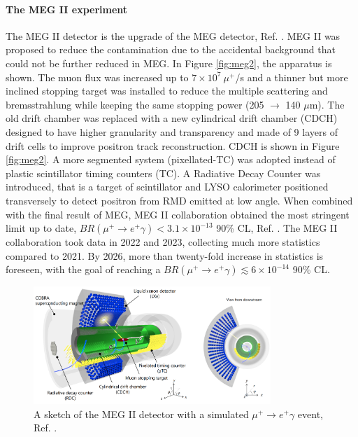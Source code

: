 \paragraph{The MEG II experiment}
The MEG II detector is the upgrade of the MEG detector, Ref. \cite{megiicollaboration2024operation}.
MEG II was proposed to reduce the contamination due to the accidental background that could not be further reduced in MEG.
In Figure \ref{fig:meg2}, the apparatus is shown. The muon flux was increased up to $7 \times 10^7 \ \mu^+$/s and a thinner but more inclined 
stopping target was installed to reduce the multiple scattering and bremsstrahlung 
while keeping the same stopping power (205 $\rightarrow$ 140 $\mu$m).
The old drift chamber was replaced with a new cylindrical drift chamber (CDCH) designed
to have higher granularity and transparency and made of 9 layers of drift cells to
improve positron track reconstruction. CDCH is shown 
in Figure \ref{fig:meg2}.
A more segmented system (pixellated-TC) was adopted instead of plastic scintillator timing counters (TC).
A Radiative Decay Counter was introduced, that is a target of scintillator and LYSO calorimeter positioned transversely to detect positron from RMD emitted at low angle.
When combined with the final result of MEG, MEG II collaboration obtained the most stringent limit up to date, $BR(\mu^+ \rightarrow e^+ \gamma)<3.1\times 10^{-13}$ 90\% CL, Ref. \cite{megiicollaboration2024search}.
The MEG II collaboration took data in 2022 and 2023, collecting much more statistics compared to 2021. By 2026, more than twenty-fold increase in statistics is foreseen, with the goal of reaching a
$BR(\mu^+ \rightarrow e^+ \gamma)\lesssim 6\times 10^{-14}$ 90\% CL.
\begin{figure}[!h]
    \centering
    \includegraphics[width =0.8\textwidth]{figures/png/Screenshot_20240307_140116.png}
    \caption[MEG II detector (I).]{A sketch of the MEG II detector with a simulated $\mu^+ \rightarrow e^+ \gamma $ event, Ref. \cite{megiicollaboration2024operation}.}
    \label{fig:meg22}
    \end{figure}
